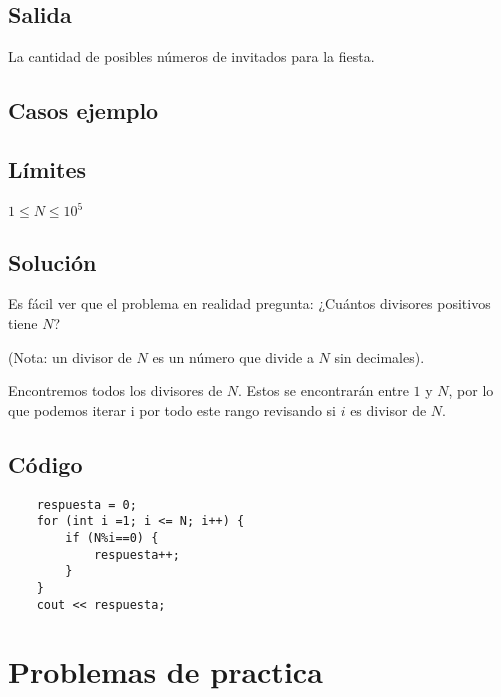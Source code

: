 \subsection*{Salida}
La cantidad de posibles números de invitados para la fiesta.
\subsection*{Casos ejemplo}
\begin{casebox2}
\end{casebox2}
\subsection*{Límites}
\begin{plimits}
	\item \(1\leq N \leq 10^5\)
\end{plimits}

\subsection*{Solución}
Es fácil ver que el problema en realidad pregunta: ¿Cuántos divisores positivos tiene \(N\)?

(Nota: un divisor de \(N\) es un número que divide a \(N\) sin decimales).

Encontremos todos los divisores de \(N\). Estos se encontrarán entre \(1\) y \(N\), por lo que podemos iterar i por todo este rango revisando si \(i\) es divisor de \(N\).
\subsection*{Código}
\begin{lstlisting}
	respuesta = 0;
	for (int i =1; i <= N; i++) {
		if (N%i==0) {
			respuesta++;
		}
	}
	cout << respuesta;
\end{lstlisting}

\section*{Problemas de practica}

\begin{exercise}
\end{exercise}

\begin{exercise}
\end{exercise}

